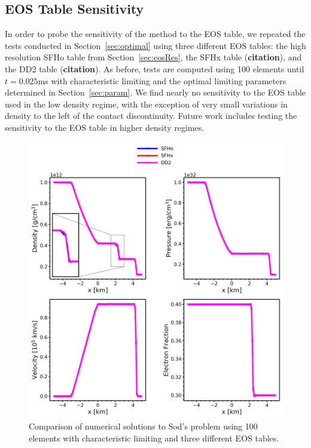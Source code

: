 \documentclass[onecolumn]{aastex62}
\begin{document}
\subsection{EOS Table Sensitivity}
In order to probe the sensitivity of the method to the EOS table, we repeated
the tests conducted in Section~\ref{sec:optimal} using three different EOS tables:
the high resolution SFHo table from Section~\ref{sec:eosRes}, the SFHx table
(\textbf{citation}), and the DD2 table (\textbf{citation}).
As before, tests are computed using 100 elements until
$t = 0.025$ms with characteristic limiting and the optimal limiting parameters determined in
Section~\ref{sec:param}. We find nearly no sensitivity to the EOS table used in
the low density regime, with the exception of very small variations in density
to the left of the contact discontinuity. Future work includes testing the
sensitivity to the EOS table in higher density regimes.
\begin{figure}[h!]
  \centering
  \includegraphics[width=36pc]{./figures/eos_all.png}
  \caption{\label{fig:SodSedovEOS} Comparison of numerical solutions to
  Sod's problem using 100 elements with characteristic limiting and three
  different EOS tables.}
\end{figure}
\end{document}
